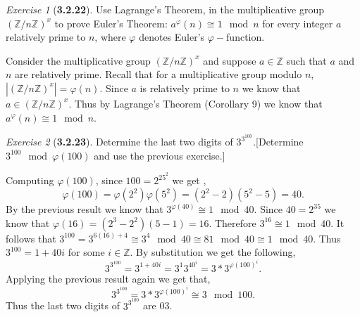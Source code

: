 \documentclass[12pt]{amsart}
\makeatletter
\theoremstyle{remark}
\newtheorem*{exercise}{Exercise}%
\def\ZZ{\ensuremath{\mathbb Z}}
\renewenvironment{proof}[1][\proofname]{\par\doublespacing
  \pushQED{\qed}%
  \normalfont \topsep6\p@\@plus6\p@\relax
  \list{}{%
    \settowidth{\leftmargin}{\itshape\proofname:\hskip\labelsep}%
    \setlength{\labelwidth}{0pt}%
    \setlength{\itemindent}{-\leftmargin}%
  }%
  \item[\hskip\labelsep\itshape#1\@addpunct{:}]\ignorespaces
}{%
  \popQED\endlist\@endpefalse
  \singlespacing
}
\theoremstyle{mycomment}
\makeatother
\begin{document}
\begin{exercise}[\textbf{3.2.22}] Use Lagrange's Theorem, in the multiplicative group $(\ZZ/n\ZZ)^x$ to prove Euler's Theorem: $a^\varphi(n) \cong 1 \mod n$ for every integer $a$ relatively prime to $n$, where $\varphi$ denotes Euler's $\varphi-$function.
   \begin{proof} Consider the multiplicative group $(\ZZ/n\ZZ)^x$ and suppose $a\in \ZZ$ such that $a$ and $n$ are relatively prime. Recall that for a multiplicative group modulo $n$, $|(\ZZ/n\ZZ)^x| = \varphi(n)$. Since $a$ is relatively prime to $n$ we know that $a \in (\ZZ/n\ZZ)^x$. Thus by Lagrange's Theorem (Corollary 9) we know that $a^\varphi(n) \cong 1 \mod n$. 
    \end{proof}
\end{exercise}
\vspace{.15in}


\begin{exercise}[\textbf{3.2.23}] Determine the last two digits of $3^{3^{100}}$.[Determine $3^{100}\mod \varphi(100)$ and use the previous exercise.]
  \begin{proof}[Solution]
    Computing $\varphi(100)$, since $100 = 2^25^2$ we get ,
    \begin{equation*}
      \varphi(100) = \varphi(2^2)\varphi(5^2) = (2^2 - 2)(5^2 - 5) = 40. 
    \end{equation*}
    By the previous result we know that $3^{\varphi(40)} \cong 1 \mod 40$. Since $40 = 2^35$ we know that $\varphi(16) = (2^3 - 2^2)(5 - 1) = 16$.
    Therefore  $3^{16} \cong 1 \mod 40$. It follows that $3^{100} = 3^{6(16) + 4} \cong 3^4 \mod 40 \cong 81 \mod 40 \cong 1 \mod 40$.
    Thus $3^{100} = 1 + 40i$ for some $i \in \ZZ$. By substitution we get the following, 
    \begin{equation*}
      3^{3^{100}} = 3^{1 + 40i} = 3^{1} 3^{40^i} = 3*3^{\varphi(100)^i}.  
    \end{equation*}
    Applying the previous result again we get that, 
    \begin{equation*}
      3^{3^{100}} = 3*3^{\varphi(100)^i} \cong 3 \mod 100.
    \end{equation*}
    Thus the last two digits of $3^{3^{100}}$ are 03.  
    \end{proof}
\end{exercise}
\vspace{.15in}
\end{document}
